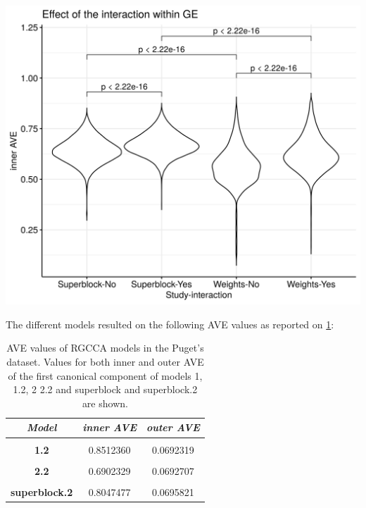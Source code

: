 \documentclass[
  12pt,
  a4paper,
  twoside,
  openright]{book}
\let\origfigure\figure
\let\endorigfigure\endfigure
\renewenvironment{figure}[1][2] {
    \expandafter\origfigure\expandafter[!htp]
} {
    \endorigfigure
}
\begin{document}
\begin{figure}
\includegraphics[width=1\linewidth]{images/pugets-weights} \caption[Effect of superblock and weights on the inner AVE on Puget's dataset.]{Effect of superblock and weights on the inner AVE on Puget's dataset. Designs with the superblock showed higher inner AVe scores than without it. Interaction yes/no indicates RNA and RNA interaction.}\label{fig:puget-weights}
\end{figure}

The different models resulted on the following AVE values as reported on \ref{tab:puget-models-ave}:

\begin{table}[H]

\caption[AVE values of RGCCA models in the Puget's dataset.]{\label{tab:puget-models-ave}AVE values of RGCCA models in the Puget's dataset. Values for both inner and outer AVE of the first canonical component of models 1, 1.2, 2 2.2 and superblock and superblock.2 are shown.}
\centering
\begin{tabular}[t]{|>{}c|c|>{}c|}
\hline
\em{\textbf{Model}} & \em{\textbf{inner AVE}} & \em{\textbf{outer AVE}}\\
\hline
\textbf{\cellcolor{gray!6}{1}} & \cellcolor{gray!6}{0.6333592} & \cellcolor{gray!6}{0.0692097}\\
\hline
\textbf{1.2} & 0.8512360 & 0.0692319\\
\hline
\textbf{\cellcolor{gray!6}{2}} & \cellcolor{gray!6}{0.2791546} & \cellcolor{gray!6}{0.0738695}\\
\hline
\textbf{2.2} & 0.6902329 & 0.0692707\\
\hline
\textbf{\cellcolor{gray!6}{superblock}} & \cellcolor{gray!6}{0.7055847} & \cellcolor{gray!6}{0.0734578}\\
\hline
\textbf{superblock.2} & 0.8047477 & 0.0695821\\
\hline
\end{tabular}
\end{table}
\end{document}
